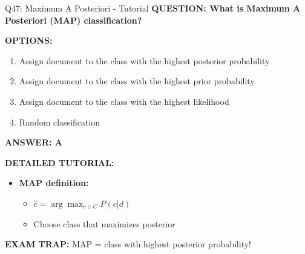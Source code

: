 \documentclass[8pt]{beamer}
\begin{document}
	\begin{frame}{Q47: Maximum A Posteriori - Tutorial}
		\fontsize{6.5}{7.5}\selectfont
		\textbf{QUESTION: What is Maximum A Posteriori (MAP) classification?}
		
		\vspace{0.1cm}
		\textbf{OPTIONS:}
		\begin{enumerate}
			\item Assign document to the class with the highest posterior probability
			\item Assign document to the class with the highest prior probability
			\item Assign document to the class with the highest likelihood
			\item Random classification
		\end{enumerate}
		
		\vspace{0.1cm}
		\textcolor{myblue}{\textbf{ANSWER: A}}
		
		\vspace{0.1cm}
		\textbf{DETAILED TUTORIAL:}
		\begin{itemize}
			\item \textbf{MAP definition:}
			\begin{itemize}
				\item $\hat{c} = \arg\max_{c \in C} P(c|d)$
				\item Choose class that maximizes posterior
			\end{itemize}
		\end{itemize}
		
		\textcolor{myred}{\textbf{EXAM TRAP:}} MAP = \textcolor{myblue}{class with highest posterior probability}!
	\end{frame}
	
\end{document}
